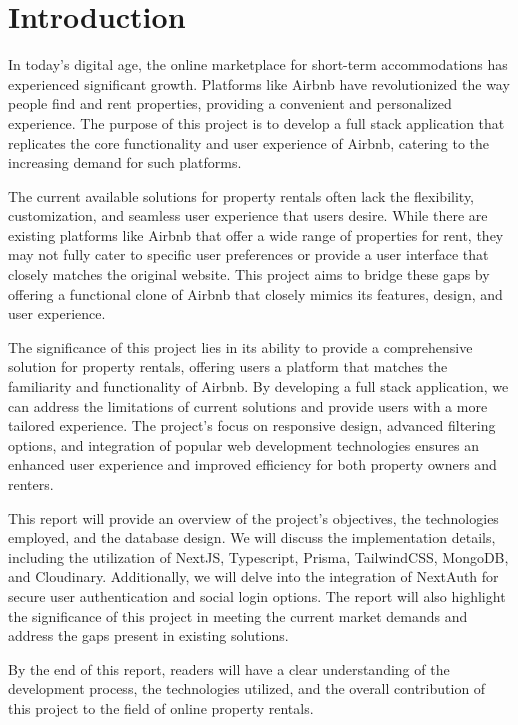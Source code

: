 \chapter{Introduction}

In today's digital age, the online marketplace for short-term accommodations has experienced significant growth. Platforms like Airbnb have revolutionized the way people find and rent properties, providing a convenient and personalized experience. The purpose of this project is to develop a full stack application that replicates the core functionality and user experience of Airbnb, catering to the increasing demand for such platforms.

The current available solutions for property rentals often lack the flexibility, customization, and seamless user experience that users desire. While there are existing platforms like Airbnb that offer a wide range of properties for rent, they may not fully cater to specific user preferences or provide a user interface that closely matches the original website. This project aims to bridge these gaps by offering a functional clone of Airbnb that closely mimics its features, design, and user experience.

The significance of this project lies in its ability to provide a comprehensive solution for property rentals, offering users a platform that matches the familiarity and functionality of Airbnb. By developing a full stack application, we can address the limitations of current solutions and provide users with a more tailored experience. The project's focus on responsive design, advanced filtering options, and integration of popular web development technologies ensures an enhanced user experience and improved efficiency for both property owners and renters.

This report will provide an overview of the project's objectives, the technologies employed, and the database design. We will discuss the implementation details, including the utilization of NextJS, Typescript, Prisma, TailwindCSS, MongoDB, and Cloudinary. Additionally, we will delve into the integration of NextAuth for secure user authentication and social login options. The report will also highlight the significance of this project in meeting the current market demands and address the gaps present in existing solutions.

By the end of this report, readers will have a clear understanding of the development process, the technologies utilized, and the overall contribution of this project to the field of online property rentals.